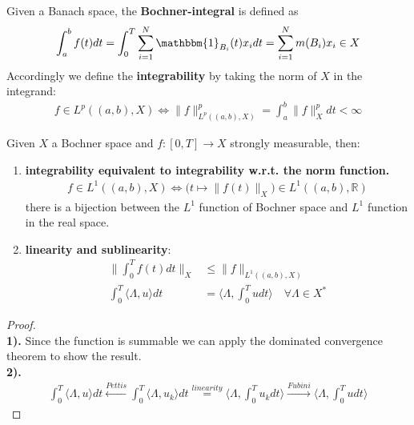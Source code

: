 \begin{definition}
	Given a Banach space, the \textbf{Bochner-integral} is defined as 
	\begin{align*}
		\int_a^b f(t) dt = \int_0^T \sum_{i = 1}^N \mathbbm{1}_{B_i}(t) x_i dt = \sum_{i = 1}^N m(B_i) x_i \in X
	\end{align*}
	Accordingly we define the \textbf{integrability }by taking the norm of $X$ in the integrand:
	\begin{align*}
		f \in L^p((a, b), X) \Leftrightarrow
		\|f\|_{L^p((a, b), X)}^p 
		= \int_a^b \|f\|_X^p dt < \infty
	\end{align*}
\end{definition}

\begin{theorem}[Bochner]
	Given $X$ a Bochner space and $f: [0, T] \rightarrow X$ strongly measurable, then:
	\begin{enumerate}
		\item \textbf{integrability equivalent to integrability w.r.t. the norm function.}
		\begin{align*}
			f \in L^1((a, b), X) \Leftrightarrow \bigg(t \mapsto \|f(t)\|_X \bigg)\in L^1((a,b), \mathbb{R})
		\end{align*}
		there is a bijection between the $L^1$ function of Bochner space and $L^1$ function in the real space. 
		\item \textbf{linearity and sublinearity}:
		\begin{align*}
			\|\int_0^T f(t) dt \|_X  &\le \|f\|_{L^1((a, b), X)}	\\
			\int_0^T \langle \Lambda, u \rangle dt &= \langle \Lambda, \int_0^T u dt \rangle \quad \forall \Lambda \in X^*
		\end{align*}
	\end{enumerate}
\end{theorem}
\begin{proof}
\quad\\
\textbf{1).} Since the function is summable we can apply the dominated convergence theorem to show the result. 
\quad\\
\textbf{2).}
\begin{align*}
	\int_0^T \langle \Lambda, u \rangle dt \overset{Pettis}{\longleftarrow} \int_0^T \langle \Lambda, u_k \rangle dt \overset{linearity}{=} \langle \Lambda, \int_0^T u_k dt \rangle \overset{Fubini}{\longrightarrow} \langle \Lambda, \int_0^T u dt \rangle   
\end{align*}
\end{proof}


